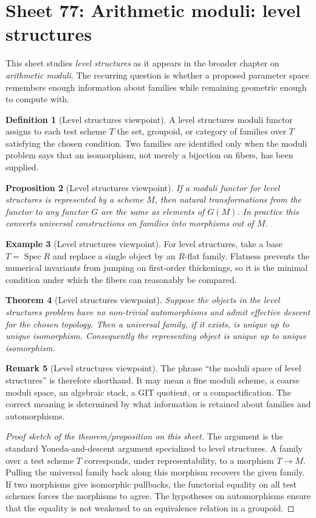 \documentclass[11pt]{amsart}
\newtheorem{theorem}{Theorem}[section]
\newtheorem{proposition}[theorem]{Proposition}
\theoremstyle{definition}
\newtheorem{definition}[theorem]{Definition}
\newtheorem{example}[theorem]{Example}
\newtheorem{remark}[theorem]{Remark}
\newcommand{\Spec}{\operatorname{Spec}}
\begin{document}
\section{Sheet 77: Arithmetic moduli: level structures}
This sheet studies \emph{level structures} as it appears in the broader chapter on \emph{arithmetic moduli}.  The recurring question is whether a proposed parameter space remembers enough information about families while remaining geometric enough to compute with.
\begin{definition}[Level structures viewpoint]
A level structures moduli functor assigns to each test scheme $T$ the set, groupoid, or category of families over $T$ satisfying the chosen condition.  Two families are identified only when the moduli problem says that an isomorphism, not merely a bijection on fibers, has been supplied.
\end{definition}
\begin{proposition}[Level structures viewpoint]
If a moduli functor for level structures is represented by a scheme $M$, then natural transformations from the functor to any functor $G$ are the same as elements of $G(M)$.  In practice this converts universal constructions on families into morphisms out of $M$.
\end{proposition}
\begin{example}[Level structures viewpoint]
For level structures, take a base $T=\Spec R$ and replace a single object by an $R$-flat family.  Flatness prevents the numerical invariants from jumping on first-order thickenings, so it is the minimal condition under which the fibers can reasonably be compared.
\end{example}
\begin{theorem}[Level structures viewpoint]
Suppose the objects in the level structures problem have no non-trivial automorphisms and admit effective descent for the chosen topology.  Then a universal family, if it exists, is unique up to unique isomorphism.  Consequently the representing object is unique up to unique isomorphism.
\end{theorem}
\begin{remark}[Level structures viewpoint]
The phrase ``the moduli space of level structures'' is therefore shorthand.  It may mean a fine moduli scheme, a coarse moduli space, an algebraic stack, a GIT quotient, or a compactification.  The correct meaning is determined by what information is retained about families and automorphisms.
\end{remark}
\begin{proof}[Proof sketch of the theorem/proposition on this sheet]
The argument is the standard Yoneda-and-descent argument specialized to level structures.  A family over a test scheme $T$ corresponds, under representability, to a morphism $T\to M$.  Pulling the universal family back along this morphism recovers the given family.  If two morphisms give isomorphic pullbacks, the functorial equality on all test schemes forces the morphisms to agree.  The hypotheses on automorphisms ensure that the equality is not weakened to an equivalence relation in a groupoid.
\end{proof}
\end{document}
